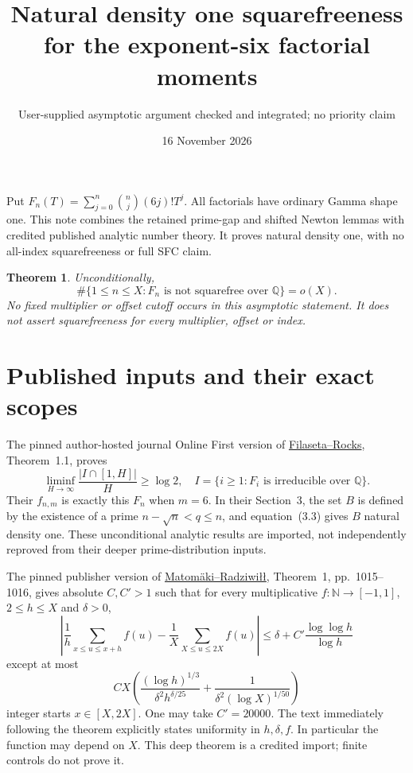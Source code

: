 \documentclass[11pt]{article}
\title{Natural density one squarefreeness for the exponent-six factorial moments}
\author{User-supplied asymptotic argument checked and integrated; no priority claim}
\date{16 November 2026}
\newtheorem{theorem}{Theorem}
\newcommand{\Q}{\mathbb Q}
\newcommand{\N}{\mathbb N}
\begin{document}
\maketitle
Put $F_n(T)=\sum_{j=0}^n\binom nj(6j)!T^j$. All factorials have ordinary
Gamma shape one. This note combines the retained prime-gap and shifted
Newton lemmas with credited published analytic number theory. It proves
natural density one, with no all-index squarefreeness or full SFC claim.

\begin{theorem}\label{thm:density}
Unconditionally,
\[
 \#\{1\le n\le X:F_n\text{ is not squarefree over }\Q\}=o(X).
\]
No fixed multiplier or offset cutoff occurs in this asymptotic statement.
It does not assert squarefreeness for every multiplier, offset or index.
\end{theorem}

\section{Published inputs and their exact scopes}
The pinned author-hosted journal Online First version of
\href{sources/filaseta-rocks-2016-published.pdf}{Filaseta--Rocks},
Theorem~1.1, proves
\[
 \liminf_{H\to\infty}\frac{|I\cap[1,H]|}{H}\ge\log2,
 \quad I=\{i\ge1:F_i\text{ is irreducible over }\Q\}.
\]
Their $f_{n,m}$ is exactly this $F_n$ when $m=6$.
In their Section~3, the set $B$ is defined by the existence of a prime
$n-\sqrt n<q\le n$, and equation~(3.3) gives $B$ natural density one.
These unconditional analytic results are imported, not independently
reproved from their deeper prime-distribution inputs.

The pinned publisher version of
\href{sources/matomaki-radziwill-2016-annals.pdf}{Matom\"aki--Radziwi\l\l},
Theorem~1, pp.~1015--1016, gives absolute $C,C'>1$ such that for every
multiplicative $f:\N\to[-1,1]$, $2\le h\le X$ and $\delta>0$,
\[
 \left|\frac1h\sum_{x\le u\le x+h}f(u)
        -\frac1X\sum_{X\le u\le2X}f(u)\right|
 \le\delta+C'\frac{\log\log h}{\log h}
\]
except at most
\[
 CX\left(\frac{(\log h)^{1/3}}{\delta^2h^{\delta/25}}
       +\frac1{\delta^2(\log X)^{1/50}}\right)
 \tag{1}
\]
integer starts $x\in[X,2X]$. One may take $C'=20000$.
The text immediately following the theorem explicitly states uniformity
in $h,\delta,f$. In particular the function may depend on $X$.
This deep theorem is a credited import; finite controls do not prove it.
\end{document}
